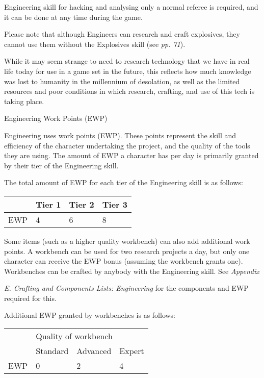\documentclass{scrbook}
\begin{document}
Engineering skill for hacking and analysing only a normal referee is required, and it can be done at any time during the game.

Please note that although Engineers can research and craft explosives, they cannot use them without the Explosives skill (see \textit{pp. 71}).

While it may seem strange to need to research technology that we have in real life today for use in a game set in the future, this reflects how much knowledge was lost to humanity in the millennium of desolation, as well as the limited resources and poor conditions in which research, crafting, and use of this tech is taking place.

Engineering Work Points (EWP)

Engineering uses work points (EWP). These points represent the skill and efficiency of the character undertaking the project, and the quality of the tools they are using. The amount of EWP a character has per day is primarily granted by their tier of the Engineering skill.

The total amount of EWP for each tier of the Engineering skill is as follows:

\begin{table}
\begin{tabular}{|l|l|l|l|} \hline 
 & Tier 1 & Tier 2 & Tier 3 \\
 \hline EWP & 4 & 6 & 8 \\
 \hline \end{tabular}

\end{table}

Some items (such as a higher quality workbench) can also add additional work points. A workbench can be used for two research projects a day, but only one character can receive the EWP bonus (assuming the workbench grants one). Workbenches can be crafted by anybody with the Engineering skill. See \textit{Appendix}

\textit{E. Crafting and Components Lists: Engineering} for the components and EWP required for this.

Additional EWP granted by workbenches is as follows:

\begin{table}
\begin{tabular}{|l|l|l|l|} \hline 
\multirow{1}{*}{}& \multicolumn{3}{|l|}{Quality of workbench} \\
\cline{2-2}\cline{3-3}\cline{4-4} & Standard & Advanced & Expert \\
 \hline EWP & 0 & 2 & 4 \\
 \hline \end{tabular}

\end{table}
\end{document}
